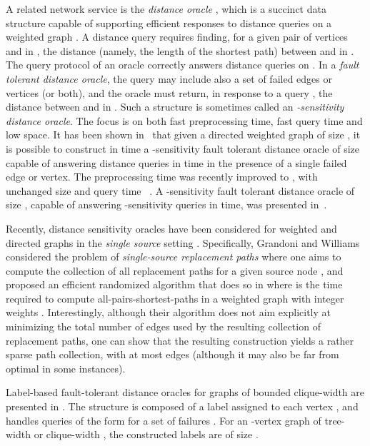 \documentclass[12pt]{article}
\begin{document}
A related network service is the {\em distance oracle} \cite{BS06,RTZ05,TZ05},
which is a succinct data structure capable of supporting
efficient responses to distance queries on a weighted graph .
A distance query  requires finding,
for a given pair of vertices  and  in , the distance
(namely, the length of the shortest path) between  and  in .
The query protocol of an oracle  correctly answers distance queries on .
In a {\em fault tolerant distance oracle}, the query
may include also a set  of failed edges or vertices (or both),
and the oracle  must return, in response to a query ,
the distance between  and  in .
Such a structure is sometimes called an {\em -sensitivity distance oracle}.
The focus is on both fast preprocessing time, fast query time and low space.
It has been shown in~\cite{DTCR08} that given a directed weighted graph 
of size , it is possible to construct in time 
a -sensitivity fault tolerant distance oracle of size 
capable of answering distance queries in  time in the presence
of a single failed edge or vertex.
The preprocessing time was recently improved to ,
with unchanged size and query time ~\cite{BK09}.
A -sensitivity fault tolerant distance oracle of size ,
capable of answering -sensitivity queries in  time,
was presented in~\cite{DP09}.
\par
Recently, distance sensitivity oracles have been considered for weighted
and directed graphs in the \emph{single source} setting \cite{GW12}.
Specifically, Grandoni and Williams considered the problem of
\emph{single-source replacement paths} where one aims to compute
the collection of all replacement paths for a given source node ,
and proposed an efficient randomized algorithm that does so in
 where  is the time required to compute
all-pairs-shortest-paths in a weighted graph with integer weights .
Interestingly, although their algorithm does not aim explicitly at minimizing
the total number of edges used by the resulting collection of
replacement paths, one can show that the resulting construction yields
a rather sparse path collection, with at most  edges
(although it may also be far from optimal in some instances).


Label-based fault-tolerant distance oracles for graphs of bounded clique-width
are presented in \cite{CT07}. The structure is composed of a label 
assigned to each vertex , and handles queries of the form 
for a set of failures . For an -vertex graph of tree-width or
clique-width , the constructed labels are of size .
\end{document}
